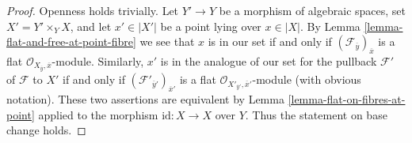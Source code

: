 \documentclass[10pt,a4paper]{amsart}
\theoremstyle{plain}
\theoremstyle{definition}
\theoremstyle{remark}
\numberwithin{equation}{subsection}
\begin{document}
\begin{proof}
Openness holds trivially. Let $Y' \to Y$ be a morphism of algebraic spaces,
set $X' = Y' \times_Y X$, 
and let $x' \in |X'|$ be a point lying over $x \in |X|$.
By Lemma \ref{lemma-flat-and-free-at-point-fibre}
we see that $x$ is in our set if and only if
$(\mathcal{F}_{\overline{y}})_{\overline{x}}$ is a flat
$\mathcal{O}_{X_{\overline{y}}, \overline{x}}$-module.
Similarly, $x'$ is in the analogue of our set for the pullback
$\mathcal{F}'$ of $\mathcal{F}$ to $X'$ if and only if
$(\mathcal{F}'_{\overline{y}'})_{\overline{x}'}$ is a flat
$\mathcal{O}_{X'_{\overline{y}'}, \overline{x}'}$-module
(with obvious notation). These two assertions are equivalent
by Lemma \ref{lemma-flat-on-fibres-at-point} applied to
the morphism $\text{id} : X \to X$ over $Y$.
Thus the statement on base change holds.
\end{proof}
\end{document}

